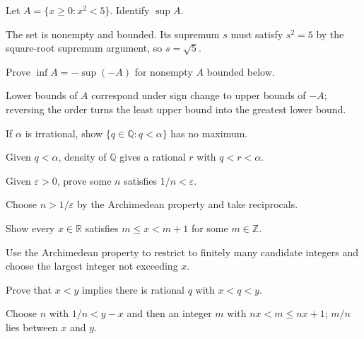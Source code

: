 \begin{problem}\label{prob:ii01-problem-01}
Let $A=\{x\ge0:x^2<5\}$. Identify $\sup A$.
\end{problem}
\begin{solution}
The set is nonempty and bounded. Its supremum $s$ must satisfy $s^2=5$ by the square-root supremum argument, so $s=\sqrt5$.
\end{solution}

\begin{problem}\label{prob:ii01-problem-02}
Prove $\inf A=-\sup(-A)$ for nonempty $A$ bounded below.
\end{problem}
\begin{solution}
Lower bounds of $A$ correspond under sign change to upper bounds of $-A$; reversing the order turns the least upper bound into the greatest lower bound.
\end{solution}

\begin{problem}\label{prob:ii01-problem-03}
If $\alpha$ is irrational, show $\{q\in\mathbb Q:q<\alpha\}$ has no maximum.
\end{problem}
\begin{solution}
Given $q<\alpha$, density of $\mathbb Q$ gives a rational $r$ with $q<r<\alpha$.
\end{solution}

\begin{problem}\label{prob:ii01-problem-04}
Given $\varepsilon>0$, prove some $n$ satisfies $1/n<\varepsilon$.
\end{problem}
\begin{solution}
Choose $n>1/\varepsilon$ by the Archimedean property and take reciprocals.
\end{solution}

\begin{problem}\label{prob:ii01-problem-05}
Show every $x\in\mathbb R$ satisfies $m\le x<m+1$ for some $m\in\mathbb Z$.
\end{problem}
\begin{solution}
Use the Archimedean property to restrict to finitely many candidate integers and choose the largest integer not exceeding $x$.
\end{solution}

\begin{problem}\label{prob:ii01-problem-06}
Prove that $x<y$ implies there is rational $q$ with $x<q<y$.
\end{problem}
\begin{solution}
Choose $n$ with $1/n<y-x$ and then an integer $m$ with $nx<m\le nx+1$; $m/n$ lies between $x$ and $y$.
\end{solution}

